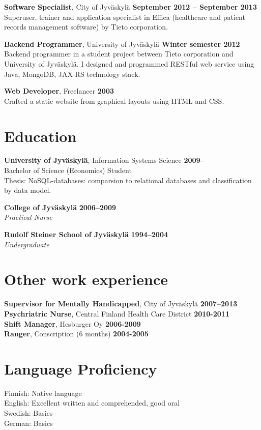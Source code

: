 \documentclass[margin,line]{resume}
\begin{document}
\begin{resume}
\textbf{Software Specialist}, City of Jyväskylä
\hfill\textbf{September 2012 -- September 2013}\\
Superuser, trainer and application specialist in Effica (healthcare and patient records management software) by Tieto corporation.

\textbf{Backend Programmer}, University of Jyväskylä 
\hfill\textbf{Winter semester 2012}\\
Backend programmer in a student project between Tieto corporation and University of Jyväskylä. I designed and programmed RESTful web service using Java, MongoDB, JAX-RS technology stack.
    
\textbf{Web Developer}, Freelancer
\hfill\textbf{2003}\\
Crafted a static website from graphical layouts using HTML and CSS.

\section{\mysidestyle Education}

\textbf{University of Jyväskylä}, Information Systems Science \hfill \textbf{2009--} \\
Bachelor of Science (Economics) Student \\
Thesis: NoSQL-databases: comparsion to relational databases and classification by data model.

\textbf{College of Jyväskylä} \hfill \textbf{ 2006--2009}\\
\textsl{Practical Nurse} 

\textbf{Rudolf Steiner School of Jyväskylä} \hfill \textbf{1994--2004}\\
\textsl{Undergraduate} 

\pagebreak 

\section{\mysidestyle Other work experience}
\textbf{Supervisor for Mentally Handicapped}, City of Jyväskylä \hfill\textbf{2007--2013}\\
\textbf{Psychriatric Nurse}, Central Finland Health Care District
\hfill\textbf{2010-2011}\\
\textbf{Shift Manager}, Hesburger Oy \hfill\textbf{2006-2009}\\
\textbf{Ranger}, Conscription (6 months) \hfill\textbf{2004-2005} 

  
\section{\mysidestyle Language Proficiency}
Finnish: Native language \\ 
English: Excellent written and comprehended, good oral \\ 
Swedish: Basics \\ 
German: Basics 


\end{resume}
\end{document}
